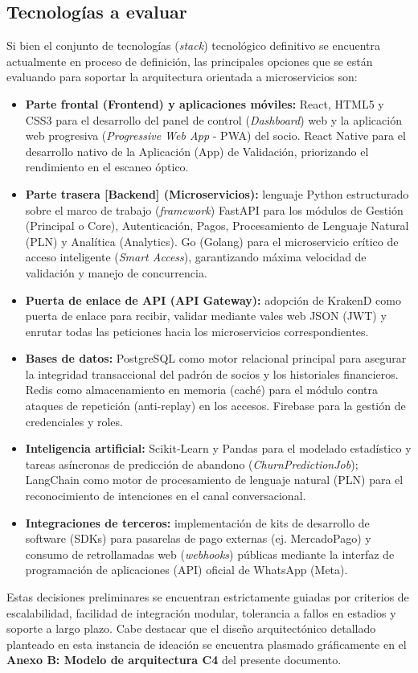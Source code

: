 \subsection*{Tecnologías a evaluar}

Si bien el conjunto de tecnologías (\textit{stack}) tecnológico definitivo se encuentra actualmente en proceso de definición, las principales opciones que se están evaluando para soportar la arquitectura orientada a microservicios son:

\begin{itemize}
    \item \textbf{Parte frontal (Frontend) y aplicaciones móviles:} React, HTML5 y CSS3 para el desarrollo del panel de control (\textit{Dashboard}) web y la aplicación web progresiva (\textit{Progressive Web App} - PWA) del socio. React Native para el desarrollo nativo de la Aplicación (App) de Validación, priorizando el rendimiento en el escaneo óptico.
    \item \textbf{Parte trasera [Backend] (Microservicios):} lenguaje Python estructurado sobre el marco de trabajo (\textit{framework}) FastAPI para los módulos de Gestión (Principal o Core), Autenticación, Pagos, Procesamiento de Lenguaje Natural (PLN) y Analítica (Analytics). Go (Golang) para el microservicio crítico de acceso inteligente (\textit{Smart Access}), garantizando máxima velocidad de validación y manejo de concurrencia.
    \item \textbf{Puerta de enlace de API (API Gateway):} adopción de KrakenD como puerta de enlace para recibir, validar mediante vales web JSON (JWT) y enrutar todas las peticiones hacia los microservicios correspondientes.
    \item \textbf{Bases de datos:} PostgreSQL como motor relacional principal para asegurar la integridad transaccional del padrón de socios y los historiales financieros. Redis como almacenamiento en memoria (caché) para el módulo contra ataques de repetición (anti-replay) en los accesos. Firebase para la gestión de credenciales y roles.
    \newpage
    \item \textbf{Inteligencia artificial:} Scikit-Learn y Pandas para el modelado estadístico y tareas asíncronas de predicción de abandono (\textit{ChurnPredictionJob}); LangChain como motor de procesamiento de lenguaje natural (PLN) para el reconocimiento de intenciones en el canal conversacional.
    \item \textbf{Integraciones de terceros:} implementación de kits de desarrollo de software (SDKs) para pasarelas de pago externas (ej. MercadoPago) y consumo de retrollamadas web (\textit{webhooks}) públicas mediante la interfaz de programación de aplicaciones (API) oficial de WhatsApp (Meta).
\end{itemize}

Estas decisiones preliminares se encuentran estrictamente guiadas por criterios de escalabilidad, facilidad de integración modular, tolerancia a fallos en estadios y soporte a largo plazo. Cabe destacar que el diseño arquitectónico detallado planteado en esta instancia de ideación se encuentra plasmado gráficamente en el \textbf{Anexo B: Modelo de arquitectura C4} del presente documento.

